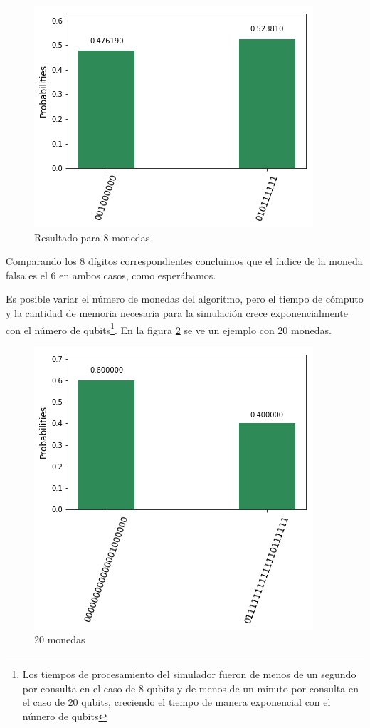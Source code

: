 \documentclass{article}
\begin{document}
\begin{center}
\begin{figure}[H]
    \centering
    \includegraphics[scale=0.7]{img/histograma.png}
    \caption{Resultado para 8 monedas}
    \label{fig:7}
\end{figure}
\end{center}
Comparando los 8 dígitos correspondientes concluimos que el índice de la moneda falsa es el 6 en ambos casos, como esperábamos.

Es posible variar el número de monedas del algoritmo, pero el tiempo de cómputo y la cantidad de memoria necesaria para la simulación crece exponencialmente con el número de qubits\footnote{ Los tiempos de procesamiento del simulador fueron de menos de un segundo por consulta en el caso de 8 qubits y de menos de un minuto por consulta en el caso de 20 qubits, creciendo el tiempo de manera exponencial con el número de qubits}. En la figura \ref{fig:8} se ve un ejemplo con 20 monedas.
\begin{center}
\begin{figure}[H]
    \centering
    \includegraphics[scale=0.7]{img/historgama2.png}
    \caption{20 monedas}
    \label{fig:8}
\end{figure}
\end{center}
\end{document}
